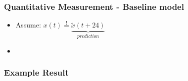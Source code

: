 \begin{frame}
	\frametitle{Quantitative Measurement - Baseline model}
	
\begin{itemize}
\item Assume: \hspace{1.5cm} $x(t) \overset{!}{=} \underbrace{\tilde{x}(t + 24)}_{prediction}$
\item[]
\end{itemize}
\end{frame}

\begin{frame}
	\frametitle{Example Result}
	

\end{frame}
